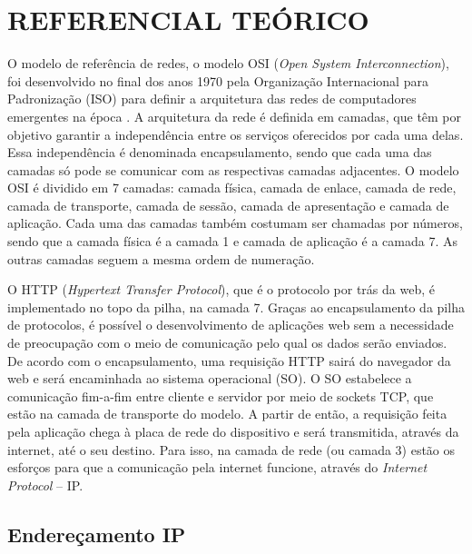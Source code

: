 \chapter{REFERENCIAL TEÓRICO}
\label{cap:referencial}

    O modelo de referência de redes, o modelo OSI (\textit{Open System Interconnection}), foi desenvolvido no final dos anos 1970 pela Organização Internacional para Padronização (ISO) para definir a arquitetura das redes de computadores emergentes na época \cite{kurose2014}. A arquitetura da rede é definida em camadas, que têm por objetivo garantir a independência entre os serviços oferecidos por cada uma delas. Essa independência é denominada encapsulamento, sendo que cada uma das camadas só pode se comunicar com as respectivas camadas adjacentes. O modelo OSI é dividido em 7 camadas: camada física, camada de enlace, camada de rede, camada de transporte, camada de sessão, camada de apresentação e camada de aplicação. Cada uma das camadas também costumam ser chamadas por números, sendo que a camada física é a camada 1 e camada de aplicação é a camada 7. As outras camadas seguem a mesma ordem de numeração.
    
    O HTTP (\textit{Hypertext Transfer Protocol}), que é o protocolo por trás da web, é implementado no topo da pilha, na camada 7. Graças ao encapsulamento da pilha de protocolos, é possível o desenvolvimento de aplicações web sem a necessidade de preocupação com o meio de comunicação pelo qual os dados serão enviados. De acordo com o encapsulamento, uma requisição HTTP sairá do navegador da web e será encaminhada ao sistema operacional (SO). O SO estabelece a comunicação fim-a-fim entre cliente e servidor por meio de sockets TCP, que estão na camada de transporte do modelo. A partir de então, a requisição feita pela aplicação chega à placa de rede do dispositivo e será transmitida, através da internet, até o seu destino. Para isso, na camada de rede (ou camada 3) estão os esforços para que a comunicação pela internet funcione, através do \textit{Internet Protocol} -- IP.
    
\section{Endereçamento IP}
    
